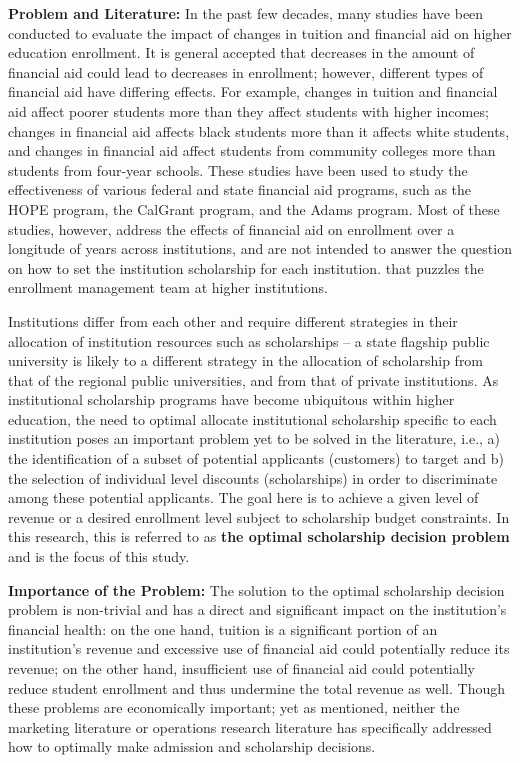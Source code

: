 \documentclass[12pt,english]{report}
\begin{document}
\vspace*{.15in} 
\noindent \textbf{Problem and Literature:}
In the past few decades, many studies have been conducted to evaluate the
impact of changes in tuition and financial aid on higher education enrollment.
It is general accepted that decreases in the amount of financial aid could lead
to decreases in enrollment; however, different types of financial aid have
differing effects. For example, changes in tuition and financial aid affect
poorer students more than they affect students with higher incomes; changes in
financial aid affects black students more than it affects white students, and
changes in financial aid affect students from community colleges more than
students from four-year schools. These studies have been used to study the
effectiveness of various federal and state financial aid programs, such as the
HOPE program, the CalGrant program, and the Adams program.  Most of these
studies, however, address the effects of financial aid on enrollment over a
longitude of years across institutions,  and are not intended to answer the
question on how to set the institution scholarship for each institution. %
that puzzles the enrollment management team at higher institutions.

Institutions differ from each other and require different strategies in their
allocation of institution resources such as scholarships --  a state flagship
public university is likely to a different strategy in the allocation of
scholarship from that of the regional public universities, and from that of
private institutions. As institutional scholarship programs have become
ubiquitous within higher education, the need to optimal allocate institutional
scholarship specific to each institution poses an important problem yet to be
solved in the literature, i.e., a) the identification of a subset of potential
applicants (customers) to target and b) the selection of individual level
discounts (scholarships) in order to discriminate among these potential
applicants.  The goal here is to achieve a given level of revenue or a desired
enrollment level subject to scholarship budget constraints.  In this research,
this is referred to as \textbf{the optimal scholarship decision problem} and is
the focus of this study.

\vspace*{.15in} 
\noindent \textbf{Importance of the Problem:}
The solution to the optimal scholarship decision problem is non-trivial and has
a direct and significant impact on the institution's financial health: on the
one hand, tuition is a significant portion of an institution's revenue and
excessive use of financial aid could potentially reduce its revenue; on the
other hand, insufficient use of financial aid could potentially reduce student
enrollment and thus undermine the total revenue as well.  Though these problems
are economically important; yet as mentioned, neither the marketing literature
or operations research literature has specifically addressed how to optimally
make admission and scholarship decisions.
\end{document}
